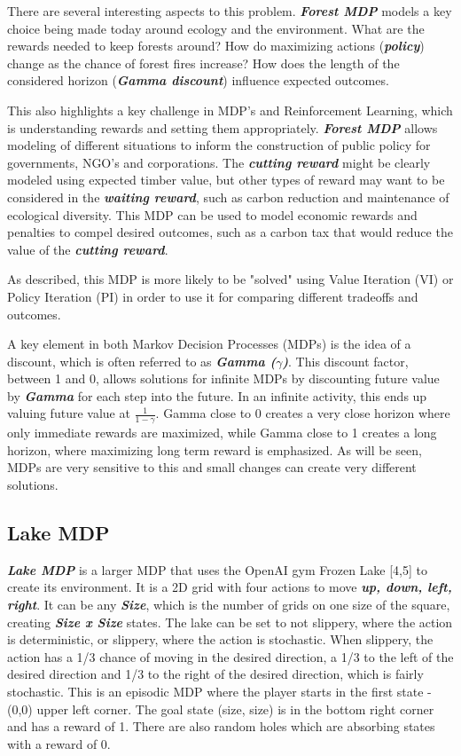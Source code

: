 \documentclass[letterpaper]{article} %
\begin{document}
There are several interesting aspects to this problem.  \textbf{\emph{Forest MDP}} models a key choice being made today around ecology and the environment.  What are the rewards needed to keep forests around?  How do maximizing actions (\textbf{\emph{policy}}) change as the chance of forest fires increase?  How does the length of the considered horizon (\textbf{\emph{Gamma discount}}) influence expected outcomes.  

This also highlights a key challenge in MDP's and Reinforcement Learning, which is understanding rewards and setting them appropriately.  \textbf{\emph{Forest MDP}}  allows modeling of different situations to inform the construction of public policy for governments, NGO's and corporations.  The \textbf{\emph{cutting reward}} might be clearly modeled using expected timber value, but other types of reward may want to be considered in the \textbf{\emph{waiting reward}}, such as carbon reduction and maintenance of ecological diversity.  This MDP can be used to model economic rewards and penalties to compel desired outcomes, such as a carbon tax that would reduce the value of the \textbf{\emph{cutting reward}}.

As described, this MDP is more likely to be "solved" using Value Iteration (VI) or Policy Iteration (PI) in order to use it for comparing different tradeoffs and outcomes.

A key element in both Markov Decision Processes (MDPs) is the idea of a discount, which is often referred to as \textbf{\emph{Gamma ($\gamma$)}}.  This discount factor, between 1 and 0, allows solutions for infinite MDPs by discounting future value by \textbf{\emph{Gamma}} for each step into the future.  In an infinite activity, this ends up valuing future value at $ \frac{1}{1- \gamma}$.  Gamma close to 0 creates a very close horizon where only immediate rewards are maximized, while Gamma close to 1 creates a long horizon, where maximizing long term reward is emphasized.  As will be seen, MDPs are very sensitive to this and small changes can create very different solutions.

\subsection{Lake MDP}
\textbf{\emph{Lake MDP}} is a larger MDP that uses the OpenAI gym Frozen Lake [4,5] to create its environment.   It is a 2D grid with four actions to move \textbf{\emph{up, down, left, right}}.  It can be any \textbf{\emph{Size}}, which is the number of grids on one size of the square, creating \textbf{\emph{Size x Size}} states.  The lake can be set to not slippery, where the action is deterministic, or slippery, where the action is stochastic.  When slippery, the action has a 1/3 chance of moving in the desired direction, a 1/3 to the left of the desired direction and 1/3 to the right of the desired direction, which is fairly stochastic.  This is an episodic MDP where the player starts in the first state - (0,0) upper left corner.  The goal state (size, size) is in the bottom right corner and has a reward of 1.  There are also random holes which are absorbing states with a reward of 0.
\end{document}
